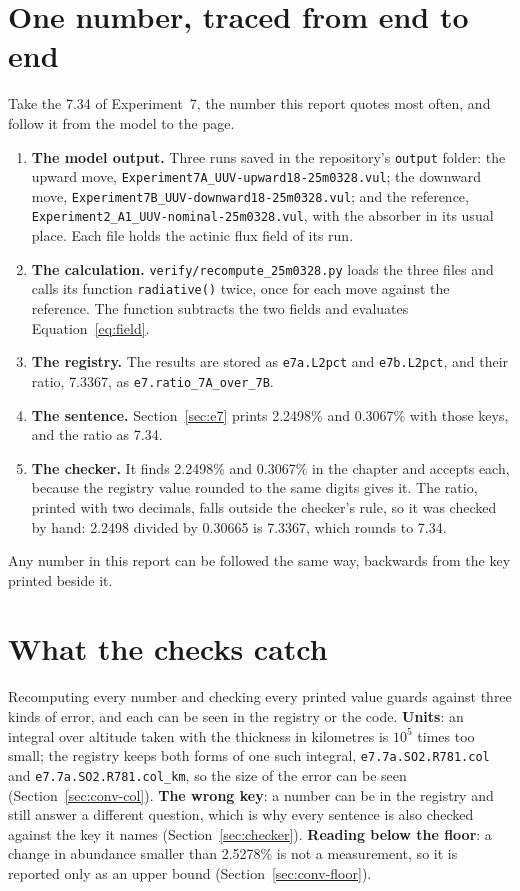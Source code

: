 \section{One number, traced from end to end}
\label{sec:trace}

Take the 7.34 of Experiment~7, the number this report quotes most often, and follow it
from the model to the page.

\begin{enumerate}[leftmargin=*, itemsep=2pt]
  \item \textbf{The model output.} Three runs saved in the repository's \texttt{output}
    folder: the upward move, \texttt{Experiment7A\_UUV-upward18-25m0328.vul}; the
    downward move, \texttt{Experiment7B\_UUV-downward18-25m0328.vul}; and the reference,
    \texttt{Experiment2\_A1\_UUV-nominal-25m0328.vul}, with the absorber in its usual
    place. Each file holds the actinic flux field of its run.
  \item \textbf{The calculation.} \texttt{verify/recompute\_25m0328.py} loads the three
    files and calls its function \texttt{radiative()} twice, once for each move against
    the reference. The function subtracts the two fields and evaluates
    Equation~\eqref{eq:field}.
  \item \textbf{The registry.} The results are stored as \texttt{e7a.L2pct} and
    \texttt{e7b.L2pct}, and their ratio, 7.3367, as \texttt{e7.ratio\_7A\_over\_7B}.
  \item \textbf{The sentence.} Section~\ref{sec:e7} prints 2.2498\% and 0.3067\% with
    those keys, and the ratio as 7.34.
  \item \textbf{The checker.} It finds 2.2498\% and 0.3067\% in the chapter and accepts
    each, because the registry value rounded to the same digits gives it. The ratio,
    printed with two decimals, falls outside the checker's rule, so it was checked by
    hand: 2.2498 divided by 0.30665 is 7.3367, which rounds to 7.34.
\end{enumerate}

Any number in this report can be followed the same way, backwards from the key printed
beside it.

\section{What the checks catch}
\label{sec:errors}

Recomputing every number and checking every printed value guards against three kinds of
error, and each can be seen in the registry or the code. \textbf{Units}: an integral over
altitude taken with the thickness in kilometres is $10^{5}$ times too small; the registry
keeps both forms of one such integral, \texttt{e7.7a.SO2.R781.col} and
\texttt{e7.7a.SO2.R781.col\_km}, so the size of the error can be seen
(Section~\ref{sec:conv-col}). \textbf{The wrong key}: a number can be in the registry
and still answer a different question, which is why every sentence is also checked
against the key it names (Section~\ref{sec:checker}). \textbf{Reading below the floor}:
a change in abundance smaller than 2.5278\% is not a measurement, so it is reported only
as an upper bound (Section~\ref{sec:conv-floor}).
